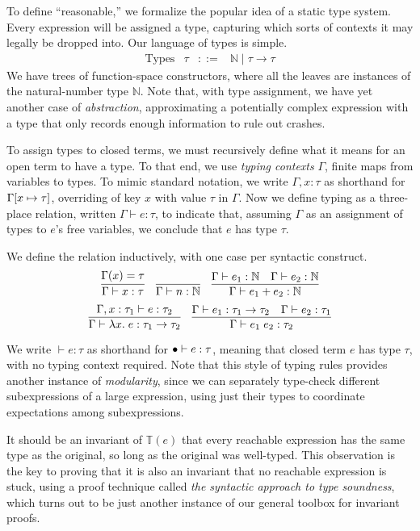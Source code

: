 \documentclass{amsbook}
\theoremstyle{definition}
\theoremstyle{remark}
\numberwithin{section}{chapter}
\numberwithin{equation}{chapter}
\begin{document}
To define ``reasonable,'' we formalize the popular idea of a static type system.
Every expression will be assigned a type, capturing which sorts of contexts it may legally be dropped into.
Our language of types is simple.
\abstraction
$$\begin{array}{rrcl}
  \textrm{Types} & \tau &::=& \mathbb N \mid \tau \to \tau
\end{array}$$
We have trees of function-space constructors, where all the leaves are instances of the natural-number type $\mathbb N$.
Note that, with type assignment, we have yet another case of \emph{abstraction}, approximating a potentially complex expression with a type that only records enough information to rule out crashes.

\newcommand{\hasty}[3]{#1 \vdash #2 : #3}

To assign types to closed terms, we must recursively define what it means for an open term to have a type.
To that end, we use \emph{typing contexts} $\Gamma$, finite maps from variables to types.
To mimic standard notation, we write $\Gamma, x : \tau$ as shorthand for $\Gamma[x \mapsto \tau]$, overriding of key $x$ with value $\tau$ in $\Gamma$.
Now we define typing as a three-place relation, written $\hasty{\Gamma}{e}{\tau}$, to indicate that, assuming $\Gamma$ as an assignment of types to $e$'s free variables, we conclude that $e$ has type $\tau$.

We define the relation inductively, with one case per syntactic construct.
\modularity
$$\infer{\hasty{\Gamma}{x}{\tau}}{
  \msel{\Gamma}{x} = \tau
}
\quad \infer{\hasty{\Gamma}{n}{\mathbb N}}{}
\quad \infer{\hasty{\Gamma}{e_1 + e_2}{\mathbb N}}{
    \hasty{\Gamma}{e_1}{\mathbb N}
    & \hasty{\Gamma}{e_2}{\mathbb N}
}$$
$$\infer{\hasty{\Gamma}{\lambda x. \; e}{\tau_1 \to \tau_2}}{
  \hasty{\Gamma, x : \tau_1}{e}{\tau_2}
}
\quad \infer{\hasty{\Gamma}{e_1 \; e_2}{\tau_2}}{
  \hasty{\Gamma}{e_1}{\tau_1 \to \tau_2}
  & \hasty{\Gamma}{e_2}{\tau_1}
}$$

We write $\hasty{}{e}{\tau}$ as shorthand for $\hasty{\mempty}{e}{\tau}$, meaning that closed term $e$ has type $\tau$, with no typing context required.
Note that this style of typing rules provides another instance of \emph{modularity}, since we can separately type-check different subexpressions of a large expression, using just their types to coordinate expectations among subexpressions.

It should be an invariant of $\mathbb T(e)$ that every reachable expression has the same type as the original, so long as the original was well-typed.
This observation is the key to proving that it is also an invariant that no reachable expression is stuck, using a proof technique called \emph{the syntactic approach to type soundness}, which turns out to be just another instance of our general toolbox for invariant proofs.
\end{document}
